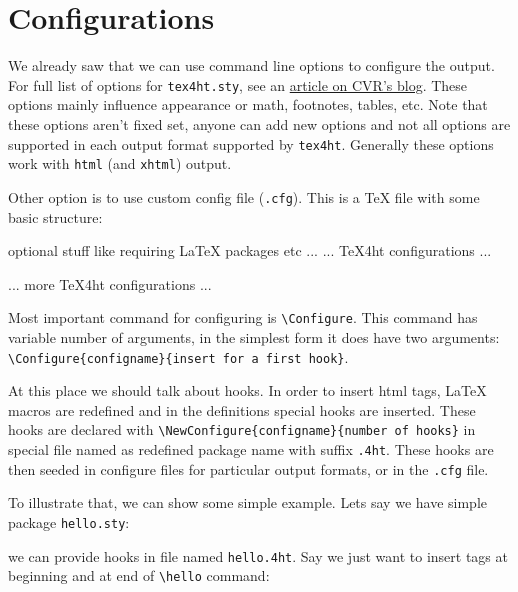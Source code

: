 \hypertarget{configurations}{%
\section{Configurations}\label{configurations}}

We already saw that we can use command line options to configure the
output. For full list of options for \texttt{tex4ht.sty}, see an
\href{http://www.cvr.cc/?p=504}{article on CVR's blog}. These options
mainly influence appearance or math, footnotes, tables, etc. Note that
these options aren't fixed set, anyone can add new options and not all
options are supported in each output format supported by
\texttt{tex4ht}. Generally these options work with \texttt{html} (and
\texttt{xhtml}) output.

Other option is to use custom config file (\texttt{.cfg}). This is a TeX
file with some basic structure:

\begin{texsource}
 optional stuff like requiring LaTeX packages etc
 ...
 ...
 TeX4ht configurations
 ...
  
 ...
 more TeX4ht configurations
 ...
 \EndPreamble
\end{texsource}

Most important command for configuring is
\texttt{\textbackslash{}Configure}. This command has variable number of
arguments, in the simplest form it does have two arguments:
\texttt{\textbackslash{}Configure\{configname\}\{insert\ for\ a\ first\ hook\}}.

At this place we should talk about hooks. In order to insert html tags,
LaTeX macros are redefined and in the definitions special hooks are
inserted. These hooks are declared with
\texttt{\textbackslash{}NewConfigure\{configname\}\{number\ of\ hooks\}}
in special file named as redefined package name with suffix
\texttt{.4ht}. These hooks are then seeded in configure files for
particular output formats, or in the \texttt{.cfg} file.

To illustrate that, we can show some simple example. Lets say we have
simple package \texttt{hello.sty}:


we can provide hooks in file named \texttt{hello.4ht}. Say we just want
to insert tags at beginning and at end of \texttt{\textbackslash{}hello}
command:

